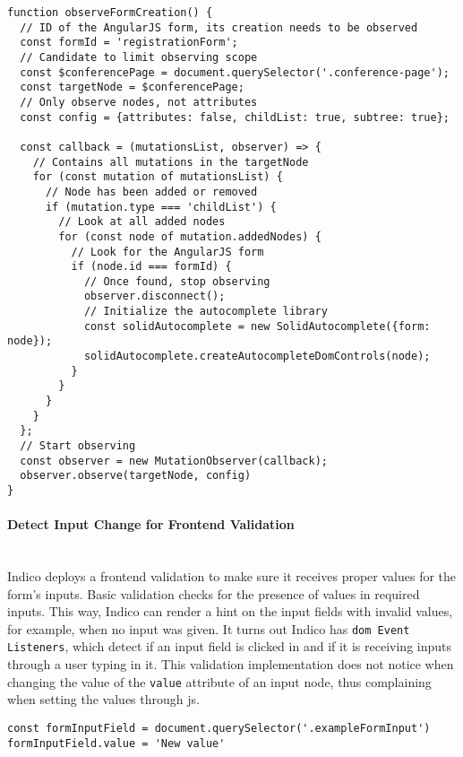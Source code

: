 \begin{lstlisting}[language=Other,columns=fullflexible, caption={Observe function in Indico}, label={lst:indico-observe}]
function observeFormCreation() {
  // ID of the AngularJS form, its creation needs to be observed
  const formId = 'registrationForm';
  // Candidate to limit observing scope
  const $conferencePage = document.querySelector('.conference-page');
  const targetNode = $conferencePage;
  // Only observe nodes, not attributes
  const config = {attributes: false, childList: true, subtree: true};

  const callback = (mutationsList, observer) => {
    // Contains all mutations in the targetNode
    for (const mutation of mutationsList) {
      // Node has been added or removed
      if (mutation.type === 'childList') {
        // Look at all added nodes
        for (const node of mutation.addedNodes) {
          // Look for the AngularJS form
          if (node.id === formId) {
            // Once found, stop observing
            observer.disconnect();
            // Initialize the autocomplete library
            const solidAutocomplete = new SolidAutocomplete({form: node});
            solidAutocomplete.createAutocompleteDomControls(node);
          }
        }
      }
    }
  };
  // Start observing
  const observer = new MutationObserver(callback);
  observer.observe(targetNode, config)
}
\end{lstlisting}

\vspace{0.5cm}
\paragraph{Detect Input Change for Frontend Validation}\label{poc2-detect-input}\mbox{}\\

Indico deploys a frontend validation to make sure it receives proper values for the form's inputs. Basic validation checks for the presence of values in required inputs. This way, Indico can render a hint on the input fields with invalid values, for example, when no input was given. It turns out Indico has \texttt{\gls{dom} Event Listeners}, which detect if an input field is clicked in and if it is receiving inputs through a user typing in it. This validation implementation does not notice when changing the value of the \texttt{value} attribute of an input node, thus complaining when setting the values through \gls{js}.

\begin{lstlisting}[language=Other,columns=fullflexible, caption={Changing the value of an input node.}, label={lst:input-change}]
const formInputField = document.querySelector('.exampleFormInput')
formInputField.value = 'New value'
\end{lstlisting}


